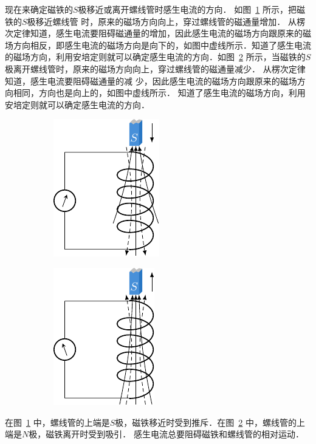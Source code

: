 现在来确定磁铁的$S$极移近或离开螺线管时感生电流的方向．
如图~\ref{fig_C_2-12a} 所示，把磁铁的$S$极移近螺线管
时，原来的磁场方向向上，穿过螺线管的磁通量增加．
从楞次定律知道，感生电流要阻碍磁通量的增加，因此感生电流的磁场方向跟原来的磁场方向相反，即感生电流的磁场方向是向下的，如图中虚线所示．知道了感生电流的磁场方向，利用安培定则就可以确定感生电流的方向．如图~\ref{fig_C_2-12b} 所示，当磁铁的$S$极离开螺线管时，原来的磁场方向向上，穿过螺线管的磁通量减少．
从楞次定律知道，感生电流要阻碍磁通量的减
少，因此感生电流的磁场方向跟原来的磁场方向相同，方向也是向上的，如图中虚线所示．
知道了感生电流的磁场方向，利用安培定则就可以确定感生电流的方向．
\begin{figure}[htbp]
    \centering
    \begin{subfigure}{0.4\linewidth}
        \centering
        \includegraphics{fig/C/2-12a.pdf}
        \caption{}\label{fig_C_2-12a}
    \end{subfigure}
    \hfil
    \begin{subfigure}{0.4\linewidth}
        \centering
        \includegraphics{fig/C/2-12b.pdf}
        \caption{}\label{fig_C_2-12b}
    \end{subfigure}
    \caption{}\label{fig_C_2-12}
\end{figure}

在图~\ref{fig_C_2-12a} 中，螺线管的上端是$S$极，磁铁移近时受到推斥．在图~\ref{fig_C_2-12b} 中，螺线管的上端是$N$极，磁铁离开时受到吸引．
感生电流总要阻碍磁铁和螺线管的相对运动．

